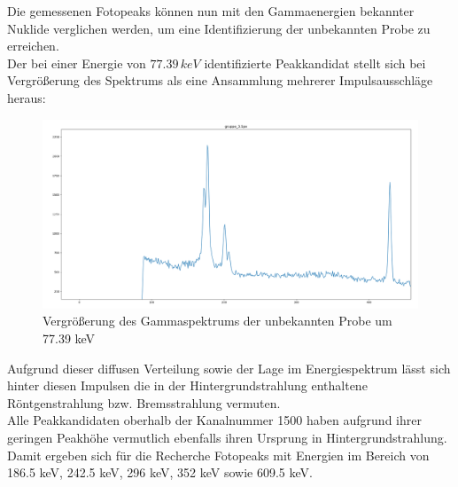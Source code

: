 \documentclass[12pt,german]{article}
\begin{document}
    Die gemessenen Fotopeaks können nun mit den Gammaenergien bekannter Nuklide verglichen werden, um eine Identifizierung der unbekannten Probe zu erreichen. \\
    Der bei einer Energie von \(77.39\, keV\) identifizierte Peakkandidat stellt sich bei Vergrößerung des Spektrums als eine Ansammlung mehrerer Impulsausschläge heraus: \\
    
    \begin{figure}[H]
        \centering
        \includegraphics[width=1.0\textwidth]{pics/gruppe_3_xrays.png}
        \caption{Vergrößerung des Gammaspektrums der unbekannten Probe um 77.39 keV}
    \end{figure}

    Aufgrund dieser diffusen Verteilung sowie der Lage im Energiespektrum lässt sich hinter diesen Impulsen die in der Hintergrundstrahlung enthaltene Röntgenstrahlung bzw. Bremsstrahlung vermuten. \\
    Alle Peakkandidaten oberhalb der Kanalnummer 1500 haben aufgrund ihrer geringen Peakhöhe vermutlich ebenfalls ihren Ursprung in Hintergrundstrahlung. \\
    Damit ergeben sich für die Recherche Fotopeaks mit Energien im Bereich von 186.5 keV, 242.5 keV, 296 keV, 352 keV sowie 609.5 keV. \\
    
\end{document}

